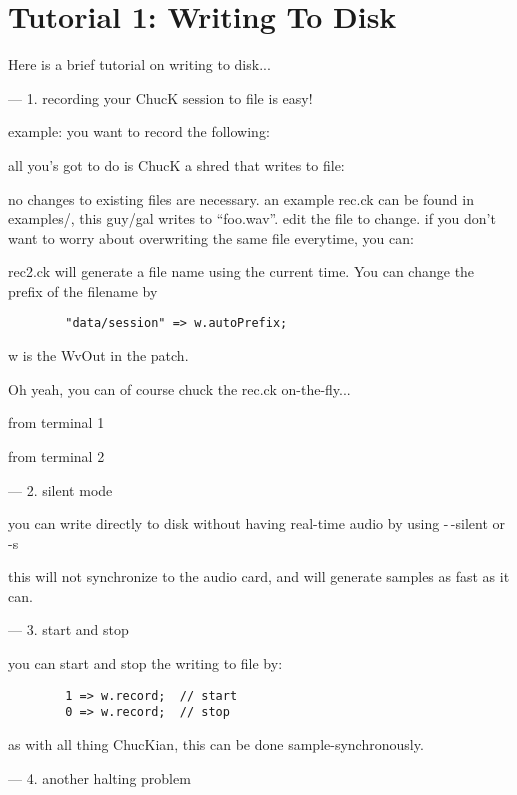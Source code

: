 \section{Tutorial 1: Writing To Disk}

Here is a brief tutorial on writing to disk...

---
1. recording your ChucK session to file is easy!

example:  you want to record the following:


all you's got to do is ChucK a shred that writes to file:


no changes to existing files are necessary.
an example rec.ck can be found in examples/, this
guy/gal writes to ``foo.wav''.  edit the file to change.
if you don't want to worry about overwriting the same
file everytime, you can:


rec2.ck will generate a file name using the current
time.  You can change the prefix of the filename by
\begin{verbatim}
        "data/session" => w.autoPrefix;
\end{verbatim}
w is the WvOut in the patch.

Oh yeah, you can of course chuck the rec.ck on-the-fly...

from terminal 1

from terminal 2


---
2. silent mode

you can write directly to disk without having real-time audio
by using -\,-silent or -s


this will not synchronize to the audio card, and will generate
samples as fast as it can.


---
3. start and stop

you can start and stop the writing to file by:
\begin{verbatim}
        1 => w.record;  // start
        0 => w.record;  // stop
\end{verbatim}
as with all thing ChucKian, this can be done
sample-synchronously.


---
4. another halting problem

